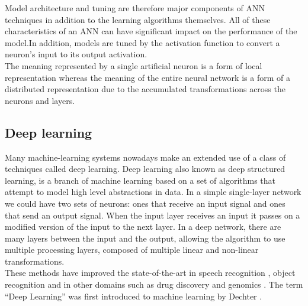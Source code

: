 Model architecture and tuning are therefore major components of ANN techniques in addition to the learning algorithms themselves. All of these characteristics of an ANN can have significant impact on the performance of the model.In addition, models are tuned by the activation function to convert a neuron's input to its output activation. \\
The meaning represented by a single artificial neuron is a form of local representation whereas the meaning of the entire neural network is a form of a distributed representation  due to the accumulated transformations across the neurons and layers.
\subsection{Deep learning}
Many machine-learning systems nowadays make an extended use of a class of techniques called deep learning. Deep learning also known as deep structured learning, is a branch of machine learning based on a set of algorithms that attempt to model high level abstractions in data. In a simple single-layer network we could have two sets of neurons: ones that receive an input signal and ones that send  an output signal. When the input layer receives an input it passes on a modified version of the input to the next layer. In a deep network, there are many layers between the input and the output, allowing the algorithm to use multiple processing layers, composed of multiple linear and non-linear transformations. \cite{Goodfellow-et-al-2016}\\
These methods have improved the state-of-the-art in speech recognition \cite{hinton_deep_2012}, object recognition \cite{girshick_rich_2014} and in other domains such as drug discovery \cite{gawehn_deep_2016} and genomics \cite{park_deep_2015}. The term ``Deep Learning'' was first introduced to machine learning by Dechter \cite{dechter_learning_1986}.
